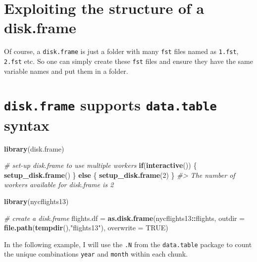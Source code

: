 \documentclass[]{book}
\newenvironment{Shaded}{\begin{snugshade}}{\end{snugshade}}
\newcommand{\CommentTok}[1]{\textcolor[rgb]{0.56,0.35,0.01}{\textit{#1}}}
\newcommand{\ControlFlowTok}[1]{\textcolor[rgb]{0.13,0.29,0.53}{\textbf{#1}}}
\newcommand{\DataTypeTok}[1]{\textcolor[rgb]{0.13,0.29,0.53}{#1}}
\newcommand{\DecValTok}[1]{\textcolor[rgb]{0.00,0.00,0.81}{#1}}
\newcommand{\KeywordTok}[1]{\textcolor[rgb]{0.13,0.29,0.53}{\textbf{#1}}}
\newcommand{\NormalTok}[1]{#1}
\newcommand{\OperatorTok}[1]{\textcolor[rgb]{0.81,0.36,0.00}{\textbf{#1}}}
\newcommand{\OtherTok}[1]{\textcolor[rgb]{0.56,0.35,0.01}{#1}}
\newcommand{\StringTok}[1]{\textcolor[rgb]{0.31,0.60,0.02}{#1}}
\begin{document}
\hypertarget{exploiting-the-structure-of-a-disk.frame}{%
\section{Exploiting the structure of a disk.frame}\label{exploiting-the-structure-of-a-disk.frame}}

Of course, a \texttt{disk.frame} is just a folder with many \texttt{fst} files named as \texttt{1.fst}, \texttt{2.fst} etc. So one can simply create these \texttt{fst} files and ensure they have the same variable names and put them in a folder.

\hypertarget{disk.frame-supports-data.table-syntax}{%
\section{\texorpdfstring{\texttt{disk.frame} supports \texttt{data.table} syntax}{disk.frame supports data.table syntax}}\label{disk.frame-supports-data.table-syntax}}

\begin{Shaded}
\begin{Highlighting}[]
\KeywordTok{library}\NormalTok{(disk.frame)}

\CommentTok{# set-up disk.frame to use multiple workers}
\ControlFlowTok{if}\NormalTok{(}\KeywordTok{interactive}\NormalTok{()) \{}
  \KeywordTok{setup_disk.frame}\NormalTok{()}
\NormalTok{\} }\ControlFlowTok{else}\NormalTok{ \{}
  \KeywordTok{setup_disk.frame}\NormalTok{(}\DecValTok{2}\NormalTok{)}
\NormalTok{\}}
\CommentTok{#> The number of workers available for disk.frame is 2}


\KeywordTok{library}\NormalTok{(nycflights13)}

\CommentTok{# create a disk.frame}
\NormalTok{flights.df =}\StringTok{ }\KeywordTok{as.disk.frame}\NormalTok{(nycflights13}\OperatorTok{::}\NormalTok{flights, }\DataTypeTok{outdir =} \KeywordTok{file.path}\NormalTok{(}\KeywordTok{tempdir}\NormalTok{(),}\StringTok{"flights13"}\NormalTok{), }\DataTypeTok{overwrite =} \OtherTok{TRUE}\NormalTok{)}
\end{Highlighting}
\end{Shaded}

In the following example, I will use the \texttt{.N} from the \texttt{data.table} package to count the unique combinations \texttt{year} and \texttt{month} within each chunk.
\end{document}
